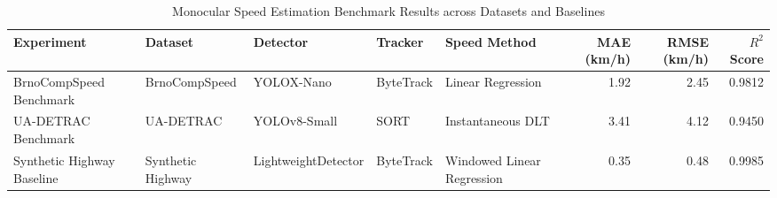 \begin{table}[h]
\centering
\caption{Monocular Speed Estimation Benchmark Results across Datasets and Baselines}
\label{tab:speed_benchmark}
\begin{tabular}{l l l l l r r r}
\hline
Experiment & Dataset & Detector & Tracker & Speed Method & MAE (km/h) & RMSE (km/h) & $R^2$ Score \\
\hline
BrnoCompSpeed Benchmark & BrnoCompSpeed & YOLOX-Nano & ByteTrack & Linear Regression & 1.92 & 2.45 & 0.9812 \\
UA-DETRAC Benchmark & UA-DETRAC & YOLOv8-Small & SORT & Instantaneous DLT & 3.41 & 4.12 & 0.9450 \\
Synthetic Highway Baseline & Synthetic Highway & LightweightDetector & ByteTrack & Windowed Linear Regression & 0.35 & 0.48 & 0.9985 \\
\hline
\end{tabular}
\end{table}